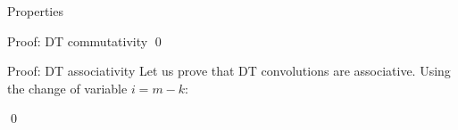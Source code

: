 \documentclass[a4paper]{article}
\begin{document}
\begin{parag}{Properties}
\begin{subparag}{Proof: DT commutativity}
        \qed
    \end{subparag}

    \begin{subparag}{Proof: DT associativity}
        Let us prove that DT convolutions are associative. Using the change of variable $i = m-k$:

        \qed
    \end{subparag}
\end{parag}
\end{document}

